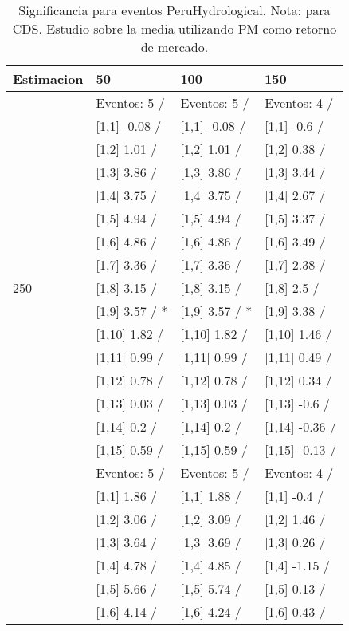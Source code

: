 \begin{table}

\caption{Significancia para eventos PeruHydrological. Nota: para CDS. Estudio sobre la media utilizando PM como retorno de mercado.}
\centering
\begin{tabular}[t]{llll}
\toprule
Estimacion & 50 & 100 & 150\\
\midrule
 & Eventos:  5 / & Eventos:  5 / & Eventos:  4 /\\
 & {}[1,1] -0.08  / & {}[1,1] -0.08  / & {}[1,1] -0.6  /\\
 & {}[1,2] 1.01  / & {}[1,2] 1.01  / & {}[1,2] 0.38  /\\
 & {}[1,3] 3.86  / & {}[1,3] 3.86  / & {}[1,3] 3.44  /\\
 & {}[1,4] 3.75  / & {}[1,4] 3.75  / & {}[1,4] 2.67  /\\
\addlinespace
 & {}[1,5] 4.94  / & {}[1,5] 4.94  / & {}[1,5] 3.37  /\\
 & {}[1,6] 4.86  / & {}[1,6] 4.86  / & {}[1,6] 3.49  /\\
 & {}[1,7] 3.36  / & {}[1,7] 3.36  / & {}[1,7] 2.38  /\\
250 & {}[1,8] 3.15  / & {}[1,8] 3.15  / & {}[1,8] 2.5  /\\
 & {}[1,9] 3.57  / * & {}[1,9] 3.57  / * & {}[1,9] 3.38  /\\
\addlinespace
 & {}[1,10] 1.82  / & {}[1,10] 1.82  / & {}[1,10] 1.46  /\\
 & {}[1,11] 0.99  / & {}[1,11] 0.99  / & {}[1,11] 0.49  /\\
 & {}[1,12] 0.78  / & {}[1,12] 0.78  / & {}[1,12] 0.34  /\\
 & {}[1,13] 0.03  / & {}[1,13] 0.03  / & {}[1,13] -0.6  /\\
 & {}[1,14] 0.2  / & {}[1,14] 0.2  / & {}[1,14] -0.36  /\\
\addlinespace
 & {}[1,15] 0.59  / & {}[1,15] 0.59  / & {}[1,15] -0.13  /\\
 & Eventos:  5 / & Eventos:  5 / & Eventos:  4 /\\
 & {}[1,1] 1.86  / & {}[1,1] 1.88  / & {}[1,1] -0.4  /\\
 & {}[1,2] 3.06  / & {}[1,2] 3.09  / & {}[1,2] 1.46  /\\
 & {}[1,3] 3.64  / & {}[1,3] 3.69  / & {}[1,3] 0.26  /\\
\addlinespace
 & {}[1,4] 4.78  / & {}[1,4] 4.85  / & {}[1,4] -1.15  /\\
 & {}[1,5] 5.66  / & {}[1,5] 5.74  / & {}[1,5] 0.13  /\\
 & {}[1,6] 4.14  / & {}[1,6] 4.24  / & {}[1,6] 0.43  /\\

\end{tabular}
\end{table}

